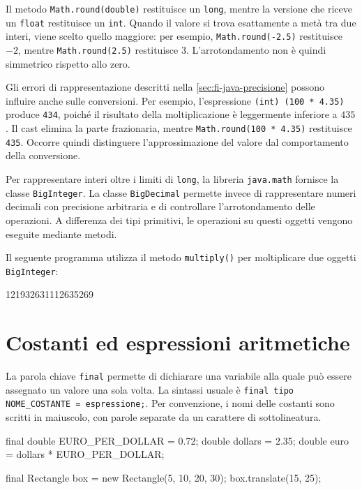 Il metodo \texttt{Math.round(double)} restituisce un
\texttt{long}, mentre la versione che riceve un
\texttt{float} restituisce un \texttt{int}.
Quando il valore si trova esattamente a metà tra due interi,
viene scelto quello maggiore: per esempio,
\texttt{Math.round(-2.5)} restituisce \(-2\), mentre
\texttt{Math.round(2.5)} restituisce \(3\).
L'arrotondamento non è quindi simmetrico rispetto allo zero.

Gli errori di rappresentazione descritti nella
\cref{sec:fi-java-precisione} possono influire anche sulle
conversioni. Per esempio, l'espressione
\texttt{(int) (100 * 4.35)} produce \texttt{434},
poiché il risultato della moltiplicazione è leggermente
inferiore a \(435\). Il cast elimina la parte frazionaria,
mentre \texttt{Math.round(100 * 4.35)} restituisce
\texttt{435}. Occorre quindi distinguere l'approssimazione
del valore dal comportamento della conversione.

Per rappresentare interi oltre i limiti di \texttt{long},
la libreria \texttt{java.math} fornisce la classe
\texttt{BigInteger}. La classe \texttt{BigDecimal} permette
invece di rappresentare numeri decimali con precisione
arbitraria e di controllare l'arrotondamento delle operazioni.
A differenza dei tipi primitivi, le operazioni su questi
oggetti vengono eseguite mediante metodi.

Il seguente programma utilizza il metodo
\texttt{multiply()} per moltiplicare due oggetti
\texttt{BigInteger}:



\begin{unipdterminal}
121932631112635269
\end{unipdterminal}


\section{Costanti ed espressioni aritmetiche}
\label{sec:fi-java-costanti-aritmetica}

La parola chiave \texttt{final} permette di dichiarare una
variabile alla quale può essere assegnato un valore una sola
volta. La sintassi usuale è
\texttt{final tipo NOME\_COSTANTE = espressione;}.
Per convenzione, i nomi delle costanti sono scritti in
maiuscolo, con parole separate da un carattere di sottolineatura.

\clearpage

\begin{unipdcode}[language=Java]
final double EURO_PER_DOLLAR = 0.72;
double dollars = 2.35;
double euro = dollars * EURO_PER_DOLLAR;

final Rectangle box = new Rectangle(5, 10, 20, 30);
box.translate(15, 25);
\end{unipdcode}

